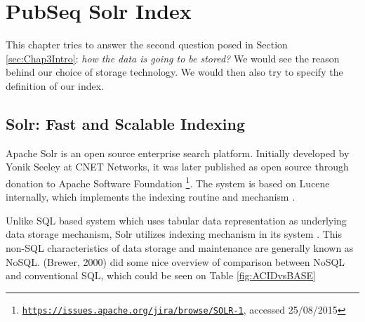 
\chapter{PubSeq Solr Index} %

\label{Chapter5} %


This chapter tries to answer the second question posed in Section \ref{sec:Chap3Intro}: \textit{how the data is going to be stored?} We would see the reason behind our choice of storage technology. We would then also try to specify the definition of our index.


\section{Solr: Fast and Scalable Indexing}

Apache Solr is an open source enterprise search platform. Initially developed by Yonik Seeley at CNET Networks, it was later published as open source through donation to Apache Software Foundation \footnote{\href{https://issues.apache.org/jira/browse/SOLR-1}{\texttt{https://issues.apache.org/jira/browse/SOLR-1}}, accessed 25/08/2015}. The system is based on Lucene internally, which implements the indexing routine and mechanism \citep{hatcher2004lucene}.

Unlike SQL based system which uses tabular data representation as underlying data storage mechanism, Solr utilizes indexing mechanism in its system \citep{smiley2015apache}. This non-SQL characteristics of data storage and maintenance are generally known as NoSQL. (Brewer, 2000) \citep{brewer2000towards} did some nice overview of comparison between NoSQL and conventional SQL, which could be seen on Table \ref{fig:ACIDvsBASE}

